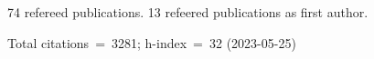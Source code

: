 74 refereed publications. 13 refeered publications as first author.

Total citations~=~3281; h-index~=~32 (2023-05-25)